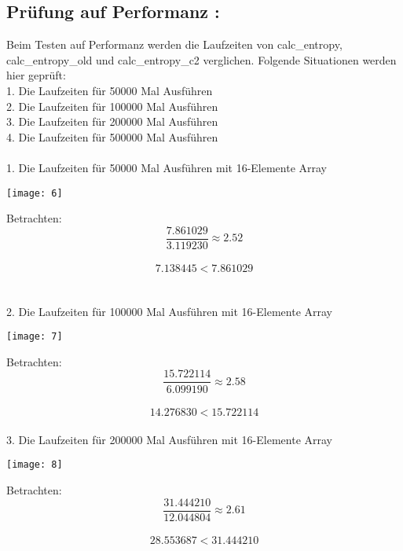 \documentclass[11pt]{article}
\begin{document}
{{{\begin{large}
\subsection{Pr\"ufung auf Performanz :}
Beim Testen auf Performanz werden die Laufzeiten von calc\_entropy, calc\_entropy\_old und calc\_entropy\_c2 verglichen. Folgende Situationen werden hier gepr\"uft:\\
{\large 1.}	Die Laufzeiten f\"ur 50000 Mal Ausf\"uhren\\
{\large 2.}	Die Laufzeiten f\"ur 100000 Mal Ausf\"uhren\\
{\large 3.}	Die Laufzeiten f\"ur 200000 Mal Ausf\"uhren\\
{\large 4.}	Die Laufzeiten f\"ur 500000 Mal Ausf\"uhren\\\\
{\large 1.}	Die Laufzeiten f\"ur 50000 Mal Ausf\"uhren mit 16-Elemente Array\\
\centerline {\texttt{[image: 6]}}
Betrachten: $$ \frac{7.861029}{3.119230} \approx 2.52$$\\
                     $$ 7.138445 < 7.861029$$\\\\
2.	Die Laufzeiten f\"ur 100000 Mal Ausf\"uhren mit 16-Elemente Array\\

\centerline {\texttt{[image: 7]} }
Betrachten: $$\frac{15.722114}{6.099190}≈ 2.58$$\\
                      $$14.276830 < 15.722114$$\\

3.	Die Laufzeiten f\"ur 200000 Mal Ausf\"uhren mit 16-Elemente Array\\

\centerline {\texttt{[image: 8]} }
Betrachten: $$\frac{31.444210}{12.044804} \approx 2.61 $$\\
                     $$ 28.553687 < 31.444210$$\\


\end{large}}}}
\end{document}
